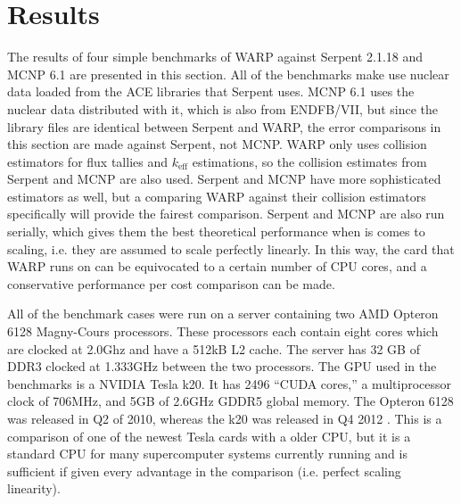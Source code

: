 \chapter{Results}
\label{chap:results}

The results of four simple benchmarks of WARP against Serpent 2.1.18 and MCNP 6.1 are presented in this section.  All of the benchmarks make use nuclear data loaded from the ACE libraries that Serpent uses.  MCNP 6.1 uses the nuclear data distributed with it, which is also from ENDFB/VII, but since the library files are identical between Serpent and WARP, the error comparisons in this section are made against Serpent, not MCNP.  WARP only uses collision estimators for flux tallies and $k_\mathrm{eff}$ estimations, so the collision estimates from Serpent and MCNP are also used.  Serpent and MCNP have more sophisticated estimators as well, but a comparing WARP against their collision estimators specifically will provide the fairest comparison.  Serpent and MCNP are also run serially, which gives them the best theoretical performance when is comes to scaling, i.e. they are assumed to scale perfectly linearly.  In this way, the card that WARP runs on can be equivocated to a certain number of CPU cores, and a conservative performance per cost comparison can be made.

All of the benchmark cases were run on a server containing two AMD Opteron 6128 Magny-Cours processors.  These processors each contain eight cores which are clocked at 2.0Ghz and have a 512kB L2 cache.  The server has 32 GB of DDR3 clocked at 1.333GHz between the two processors.  The GPU used in the benchmarks is a NVIDIA Tesla k20.  It has 2496 ``CUDA cores,'' a multiprocessor clock of 706MHz, and 5GB of 2.6GHz GDDR5 global memory.  The Opteron 6128 was released in Q2 of 2010, whereas the k20 was released in Q4 2012 \cite{opterondate,k20date}.  This is a comparison of one of the newest Tesla cards with a older CPU, but it is a standard CPU for many supercomputer systems currently running and is sufficient if given every advantage in the comparison (i.e. perfect scaling linearity).

